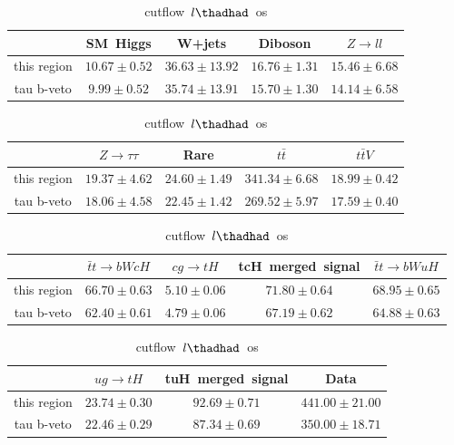 \begin{table}
\caption{cutflow~$l\thadhad$~os}
\centering
\begin{tabular}{|c|c|c|c|c|} \hline
 & SM~Higgs & W+jets & Diboson & $Z\to ll$\\\hline
this region & $10.67\pm0.52$ & $36.63\pm13.92$ & $16.76\pm1.31$ & $15.46\pm6.68$\\\hline
tau b-veto & $9.99\pm0.52$ & $35.74\pm13.91$ & $15.70\pm1.30$ & $14.14\pm6.58$\\\hline
\end{tabular}
\begin{tabular}{|c|c|c|c|c|} \hline
 & $Z\to \tau\tau$ & Rare & $t\bar{t}$ & $t\bar{t}V$\\\hline
this region & $19.37\pm4.62$ & $24.60\pm1.49$ & $341.34\pm6.68$ & $18.99\pm0.42$\\\hline
tau b-veto & $18.06\pm4.58$ & $22.45\pm1.42$ & $269.52\pm5.97$ & $17.59\pm0.40$\\\hline
\end{tabular}
\begin{tabular}{|c|c|c|c|c|} \hline
 & $\bar{t}t\to bWcH$ & $cg\to tH$ & tcH~merged~signal & $\bar{t}t\to bWuH$\\\hline
this region & $66.70\pm0.63$ & $5.10\pm0.06$ & $71.80\pm0.64$ & $68.95\pm0.65$\\\hline
tau b-veto & $62.40\pm0.61$ & $4.79\pm0.06$ & $67.19\pm0.62$ & $64.88\pm0.63$\\\hline
\end{tabular}
\begin{tabular}{|c|c|c|c|} \hline
 & $ug\to tH$ & tuH~merged~signal & Data\\\hline
this region & $23.74\pm0.30$ & $92.69\pm0.71$ & $441.00\pm21.00$\\\hline
tau b-veto & $22.46\pm0.29$ & $87.34\pm0.69$ & $350.00\pm18.71$\\\hline
\end{tabular}
\label{tab:cutflow_reg1l2tau1bnj_os}
\end{table}
